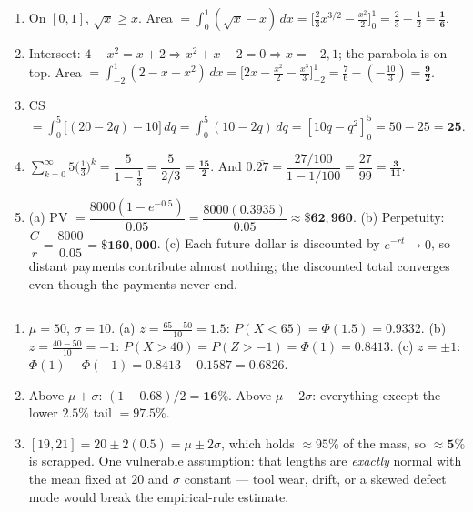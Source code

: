 \documentclass[11pt]{article}
\newcommand{\strand}[1]{%
  \vspace{0.7em}%
  \noindent{\large\textbf{\textcolor{secblue}{#1}}}\par\vspace{0.2em}%
  \noindent\rule{\textwidth}{0.3pt}\par%
}
\begin{document}
\begin{enumerate}[leftmargin=2em, itemsep=0.6em, start=12]
\item On $[0,1]$, $\sqrt{x}\ge x$. Area $=\displaystyle\int_0^1 (\sqrt{x}-x)\,dx = \bigl[\tfrac23 x^{3/2} - \tfrac{x^2}{2}\bigr]_0^1 = \tfrac23 - \tfrac12 = \mathbf{\tfrac16}$.

\item Intersect: $4-x^2 = x+2 \Rightarrow x^2+x-2=0 \Rightarrow x=-2,1$; the parabola is on top. Area $=\displaystyle\int_{-2}^{1}(2 - x - x^2)\,dx = \bigl[2x - \tfrac{x^2}{2} - \tfrac{x^3}{3}\bigr]_{-2}^{1} = \tfrac76 - (-\tfrac{10}{3}) = \mathbf{\tfrac{9}{2}}$.

\item CS $=\displaystyle\int_0^5 \bigl[(20-2q) - 10\bigr]\,dq = \int_0^5 (10-2q)\,dq = [10q - q^2]_0^5 = 50-25 = \mathbf{25}$.

\item $\displaystyle\sum_{k=0}^\infty 5\bigl(\tfrac13\bigr)^k = \dfrac{5}{1-\frac13} = \dfrac{5}{2/3} = \mathbf{\tfrac{15}{2}}$. \;And $0.\overline{27} = \dfrac{27/100}{1 - 1/100} = \dfrac{27}{99} = \mathbf{\tfrac{3}{11}}$.

\item (a) PV $=\dfrac{8000(1-e^{-0.5})}{0.05} = \dfrac{8000(0.3935)}{0.05} \approx \mathbf{\$62{,}960}$. \;(b) Perpetuity: $\dfrac{C}{r} = \dfrac{8000}{0.05} = \mathbf{\$160{,}000}$. \;(c) Each future dollar is discounted by $e^{-rt}\to 0$, so distant payments contribute almost nothing; the discounted total converges even though the payments never end.
\end{enumerate}

\strand{4.\quad The Normal Distribution}

\begin{enumerate}[leftmargin=2em, itemsep=0.6em, start=17]
\item $\mu=50$, $\sigma=10$. \;(a) $z=\tfrac{65-50}{10}=1.5$: $P(X<65)=\Phi(1.5)=\mathbf{0.9332}$. \;(b) $z=\tfrac{40-50}{10}=-1$: $P(X>40)=P(Z>-1)=\Phi(1)=\mathbf{0.8413}$. \;(c) $z=\pm1$: $\Phi(1)-\Phi(-1)=0.8413-0.1587=\mathbf{0.6826}$.

\item Above $\mu+\sigma$: $(1-0.68)/2 = \mathbf{16\%}$. \;Above $\mu-2\sigma$: everything except the lower $2.5\%$ tail $=\mathbf{97.5\%}$.

\item $[19,21] = 20 \pm 2(0.5) = \mu \pm 2\sigma$, which holds $\approx 95\%$ of the mass, so $\approx \mathbf{5\%}$ is scrapped. One vulnerable assumption: that lengths are \emph{exactly} normal with the mean fixed at $20$ and $\sigma$ constant --- tool wear, drift, or a skewed defect mode would break the empirical-rule estimate.
\end{enumerate}
\end{document}
